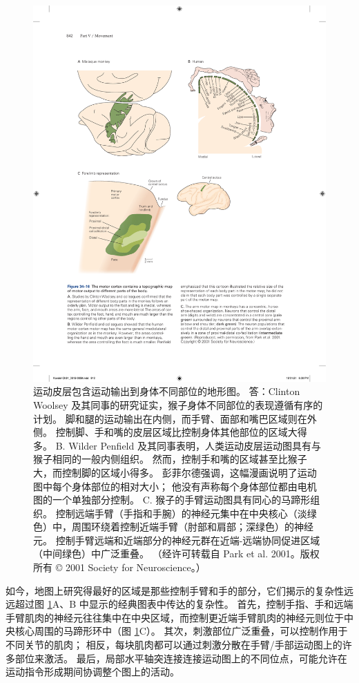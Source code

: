 \begin{figure}[htbp]
	\centering
	\includegraphics[width=0.85\linewidth]{chap34/fig_34_16}
	\caption{运动皮层包含运动输出到身体不同部位的地形图。 答：Clinton Woolsey 及其同事的研究证实，猴子身体不同部位的表现遵循有序的计划。 脚和腿的运动输出在内侧，而手臂、面部和嘴巴区域则在外侧。 控制脚、手和嘴的皮层区域比控制身体其他部位的区域大得多。 B. Wilder Penfield 及其同事表明，人类运动皮层运动图具有与猴子相同的一般内侧组织。 然而，控制手和嘴的区域甚至比猴子大，而控制脚的区域小得多。 彭菲尔德强调，这幅漫画说明了运动图中每个身体部位的相对大小； 他没有声称每个身体部位都由电机图的一个单独部分控制。 C. 猴子的手臂运动图具有同心的马蹄形组织。 控制远端手臂（手指和手腕）的神经元集中在中央核心（淡绿色）中，周围环绕着控制近端手臂（肘部和肩部；深绿色）的神经元。 控制手臂远端和近端部分的神经元群在近端-远端协同促进区域（中间绿色）中广泛重叠。 （经许可转载自 Park et al. 2001。版权所有 © 2001 Society for Neuroscience。）}
	\label{fig:34_16}
\end{figure}

如今，地图上研究得最好的区域是那些控制手臂和手的部分，它们揭示的复杂性远远超过图 \ref{fig:34_16}A、B 中显示的经典图表中传达的复杂性。 首先，控制手指、手和远端手臂肌肉的神经元往往集中在中央区域，而控制更近端手臂肌肉的神经元则位于中央核心周围的马蹄形环中（图 \ref{fig:34_16}C）。 其次，刺激部位广泛重叠，可以控制作用于不同关节的肌肉； 相反，每块肌肉都可以通过刺激分散在手臂/手部运动图上的许多部位来激活。 最后，局部水平轴突连接连接运动图上的不同位点，可能允许在运动指令形成期间协调整个图上的活动。


